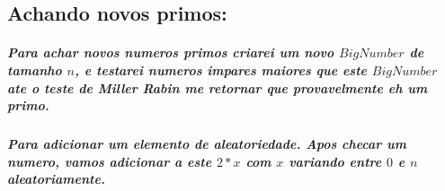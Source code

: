 \documentclass[12pt,twoside, a4paper, twocolumn]{article}
\begin{document}
\subsection{Achando novos primos:}

\subparagraph*{Para achar novos numeros primos criarei um novo $BigNumber$ de tamanho $n$, e testarei numeros impares maiores que este $BigNumber$ ate o teste de Miller Rabin me retornar que provavelmente eh um primo.}

\subparagraph*{Para adicionar um elemento de aleatoriedade. Apos checar um numero, vamos adicionar a este $2*x$ com $x$ variando entre $0$ e $n$ aleatoriamente.}
\end{document}
